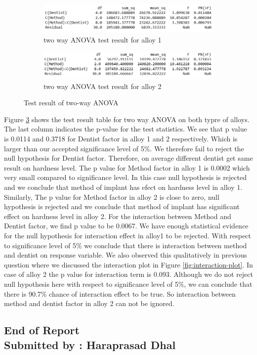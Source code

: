 \documentclass[12pt,a4paper]{style}
\begin{document}
	\begin{figure}[h]
	\centering
	\begin{subfigure}[t]{0.8\textwidth}
		\includegraphics[width=\textwidth]{two_anova_alloy1.png}
		\caption{two way ANOVA test result for alloy 1}
		\label{fig:two-way-alloy1}
	\end{subfigure}
	\hfill
	\begin{subfigure}[t]{0.8\textwidth}
		\includegraphics[width=\textwidth]{two_anova_alloy2.png}
		\caption{two way ANOVA test result for alloy 2}
		\label{figtwo-way-alloy2}
	\end{subfigure}
	\caption{Test result of two-way ANOVA}
	\label{fig:two-way-anova}
	\end{figure}
	
		Figure \ref{fig:two-way-anova} shows the test result table for two way ANOVA on both typre of alloys. The last column indicates the p-value for the test statistics. We see that p value is 0.0114 and  0.3718 for Dentist factor in alloy 1 and 2 respectively. Which is larger than our accepted significance level of 5\%. We therefore fail to reject the null hypothesis for Dentist factor. Therefore, on average different dentist get same result on hardness level. The p value for Method factor in alloy 1 is 0.0002 which very small compared to significance level. In this case null hypothesis is rejected and we conclude that method of implant has efect on hardness level in alloy 1.	Similarly, The p value for Method factor in alloy 2 is close to zero, null hypothesis is rejected and we conclude that method of implant has significant effect on hardness level in alloy 2. For the interaction between Method and Dentist factor, we find p value to be 0.0067. We have enough statistical evidence for the null hypothesis for interaction effect in alloy1 to be rejected. With respect to significance level of 5\% we conclude that there is interaction between method and dentist on response variable. We also observed this qualitatively in previous question where we discussed the interaction plot in Figure \ref{fig:interaction-plot}. In case of alloy 2 the p value for interaction term is 0.093. Although we do not reject null hypothesis here with respect to significance level of 5\%, we can conclude that there is 90.7\% chance of interaction effect to be true. So interaction between method and dentist factor in alloy 2 can not be ignored. 	
		
\centering
\vspace{20pt}
\subsection*{End of Report\\Submitted by : Haraprasad Dhal}
\end{document}
